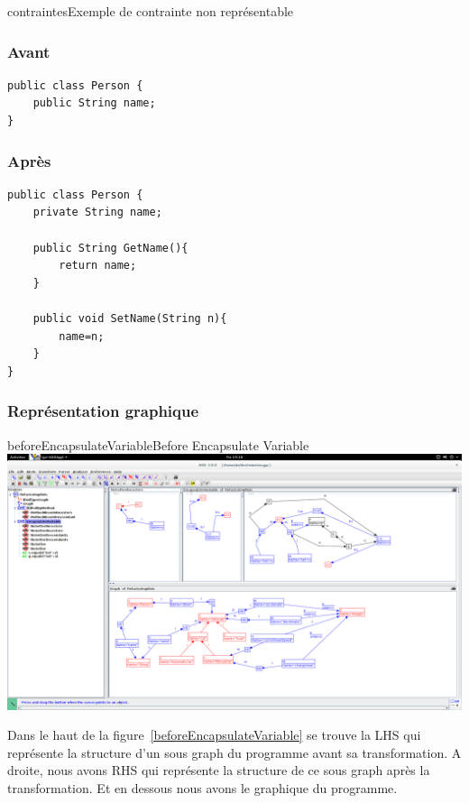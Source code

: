 \documentclass[a4paper, 12pt]{article}
\begin{document}
\begin{figu}{contraintes}{Exemple de contrainte non représentable}
\subsubsection{Avant}

\begin{lstlisting}[frame=single]
public class Person {
	public String name;
}
\end{lstlisting}

\subsubsection{Après}

\begin{lstlisting}[frame=single]
public class Person {
	private String name;

	public String GetName(){
		return name;
	}

	public void SetName(String n){
		name=n;
	}
}
\end{lstlisting}

\subsubsection{Représentation graphique}

\begin{myfig}{beforeEncapsulateVariable}{Before Encapsulate Variable}
\includegraphics[width=\textwidth]{beforeEncapsulateVariable.png}
\end{myfig}

Dans le haut de la figure~\ref{beforeEncapsulateVariable} se trouve la LHS qui représente la structure d'un sous graph du programme avant sa transformation. A droite, nous avons RHS qui représente la structure de ce sous graph après la transformation. Et en dessous nous avons le graphique du programme.


\end{figu}
\end{document}
